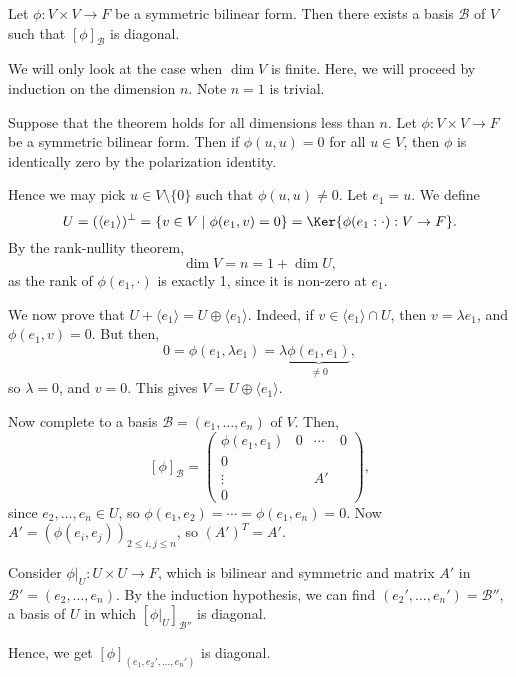 \documentclass[12pt]{article}
\begin{document}
\begin{theorem}
	Let $\phi : V \times V \to F$ be a symmetric bilinear form. Then there exists a basis $\mathcal{B}$ of $V$ such that $[\phi]_{\mathcal{B}}$ is diagonal.
\end{theorem}

\begin{proofbox}
	We will only look at the case when $\dim V$ is finite. Here, we will proceed by induction on the dimension $n$. Note $n = 1$ is trivial.

	Suppose that the theorem holds for all dimensions less than $n$. Let $\phi : V \times V \to F$ be a symmetric bilinear form. Then if $\phi(u, u) = 0$ for all $u \in V$, then $\phi$ is identically zero by the polarization identity.

	Hence we may pick $u \in V \setminus \{0\}$ such that $\phi(u, u) \neq 0$. Let $e_1 = u$. We define
	\[
		U = (\langle e_1 \rangle)^{\perp} = \{v \in V \mid \phi(e_1, v) = 0\} = \Ker \{ \phi(e_1: \cdot) : V \to F\}
	.\]
	By the rank-nullity theorem,
	\[
	\dim V = n = 1 + \dim U
	,\]
	as the rank of $\phi(e_1, \cdot)$ is exactly 1, since it is non-zero at $e_1$.

	We now prove that $U + \langle e_1 \rangle = U \oplus \langle e_1 \rangle$. Indeed, if $v \in \langle e_1 \rangle \cap U$, then $v = \lambda e_1$, and $\phi(e_1, v) = 0$. But then,
	\[
		0 = \phi(e_1, \lambda e_1) = \lambda \underbrace{\phi(e_1, e_1)}_{\neq 0}
	,\]
	so $\lambda = 0$, and $v = 0$. This gives $V = U \oplus \langle e_1 \rangle$.

	Now complete to a basis $\mathcal{B} = (e_1, \ldots, e_n)$ of $V$. Then,
	\[
		[\phi]_{\mathcal{B}} = 
		\begin{pmatrix}
			\phi(e_1, e_1) & 0 & \cdots & 0 \\
			0 & & & \\
			\vdots & & A' & \\
			0 & & &
		\end{pmatrix}
	,\]
	since $e_2, \ldots, e_n \in U$, so $\phi(e_1, e_2) = \cdots = \phi(e_1, e_n) = 0$. Now $A' = (\phi(e_i, e_j))_{2 \leq i, j \leq n}$, so $(A')^{T} = A'$.

	Consider $\phi|_{U} : U \times U \to F$, which is bilinear and symmetric and matrix $A'$ in $\mathcal{B}' = (e_2, \ldots, e_n)$. By the induction hypothesis, we can find $(e_2', \ldots, e_n') = \mathcal{B}''$, a basis of $U$ in which $[\phi|_{U}]_{\mathcal{B}''}$ is diagonal.

	Hence, we get $[\phi]_{(e_1, e_2', \ldots, e_n')}$ is diagonal.
\end{proofbox}
\end{document}
